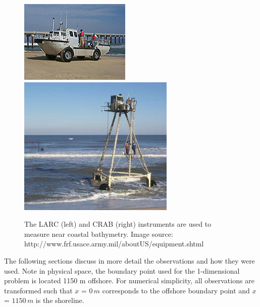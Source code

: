 \begin{figure}[H]
\includegraphics[width=.48\linewidth]{img/LARC.jpg}\hfill
\includegraphics[width=.48\linewidth]{img/CRAB2.JPG}
\caption{The LARC (left) and CRAB (right) instruments are used to measure near coastal bathymetry. Image source: http://www.frf.usace.army.mil/aboutUS/equipment.shtml}
\label{crablarc}
\end{figure}

The following sections discuss in more detail the observations and how they were used. Note in physical space, the boundary point used for the 1-dimensional problem is located 1150 m offshore. For numerical simplicity, all observations are transformed such that $\textit{x}$ = ${0 \,m}$ corresponds to the offshore boundary point and $\textit{x}$ = ${1150 \,m}$ is the shoreline. 

